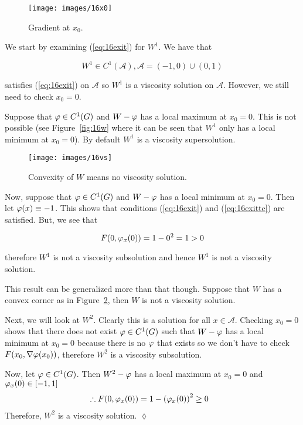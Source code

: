 \begin{figure}[ht!]
\centering
\texttt{[image: images/16x0]}%
\caption{Gradient at $x_0$.}%
\label{fig:16x0}
\end{figure}

\begin{example}
We start by examining (\ref{eq:16exit}) for $W^1$.
We have that

\begin{equation*}
W^1\in C^1(\mathcal{A}), \mathcal{A}=(-1,0)\cup(0,1)
\end{equation*}

satisfies (\ref{eq:16exit}) on $\mathcal{A}$ so $W^1$ is a viscosity solution on $\mathcal{A}$.
However, we still need to check $x_0=0$.

Suppose that $\varphi\in C^1(G)$ and $W-\varphi$ has a local maximum at $x_0=0$.
This is not possible (see Figure~\ref{fig:16w} where it can be seen that $W^1$ only has a local minimum at $x_0=0$).
By default $W^1$ is a viscosity supersolution.

\begin{figure}[ht!]
\centering
\texttt{[image: images/16vs]}
\caption{Convexity of $W$ means no viscosity solution.}%
\label{fig:16vs}
\end{figure}

Now, suppose that $\varphi\in C^1(G)$ and $W-\varphi$ has a local minimum at $x_0=0$.
Then let $\varphi(x)\equiv-1$.
This shows that conditions (\ref{eq:16exit}) and (\ref{eq:16exittc}) are satisfied.
But, we see that

\begin{equation*}
F(0,\varphi_x(0))=1-0^2=1>0
\end{equation*}

therefore $W^1$ is not a viscosity subsolution and hence $W^1$ is not a viscosity solution.

This result can be generalized more than that though.
Suppose that $W$ has a convex corner as in Figure~\ref{fig:16vs}, then $W$ is not a viscosity solution.

Next, we will look at $W^2$.
Clearly this is a solution for all $x\in\mathcal{A}$.
Checking $x_0=0$ shows that there does not exist $\varphi\in C^1(G)$ such that $W-\varphi$ has a local minimum at $x_0=0$ because there is no $\varphi$ that exists so we don't have to check $F(x_0,\nabla\varphi(x_0))$, therefore $W^2$ is a viscosity subsolution.

Now, let $\varphi\in C^1(G)$.
Then $W^2-\varphi$ has a local maximum at $x_0=0$ and $\varphi_x(0)\in[-1,1]$
\begin{align*}
&\therefore F(0,\varphi_x(0)) = 1-{(\varphi_x(0))}^2\geq0
\end{align*}
Therefore, $W^2$ is a viscosity solution.
$\lozenge$
\end{example}

